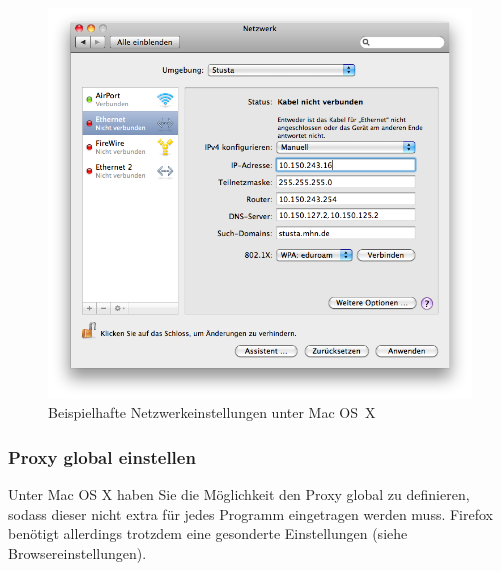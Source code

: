 \documentclass[a4paper,12pt]{scrartcl}
\begin{document}
\begin{enumerate}
\begin{figure}[h!]
\begin{minipage}[c]{0.38\linewidth}
        \end{minipage}
        \begin{minipage}[c]{0.60\linewidth}
          \centering
          \includegraphics[width=0.9\linewidth,keepaspectratio]{Bilder/IP_MAC}
          \caption{Beispielhafte Netzwerkeinstellungen unter Mac OS~X}
        \end{minipage}
      \vspace{-20pt}
      \end{figure}
\end{enumerate}
\vspace{-15pt}
\subsubsection*{Proxy global einstellen}
Unter Mac OS X haben Sie die Möglichkeit den Proxy global zu definieren, sodass dieser nicht extra für jedes Programm eingetragen werden muss. Firefox benötigt allerdings trotzdem eine gesonderte Einstellungen (siehe Browsereinstellungen). %
\end{document}
